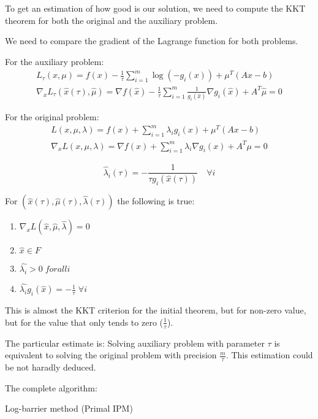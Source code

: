 To get an estimation of how good is our solution, we need to compute the KKT theorem for both the original and the auxiliary problem.

We need to compare the gradient of the Lagrange function for both problems.

For the auxiliary problem:
\begin{gather*}
    L_\tau (x, \mu) = f(x) - \frac{1}{\tau} \sum_{i=1}^m \log{(-g_i(x))} + \mu^T (A x - b) \\
    \nabla_x L_\tau (\hat{x}(\tau), \hat{\mu}) = \nabla f(\hat{x}) - \frac{1}{\tau} \sum_{i=1}^m \frac{1}{g_i(\hat{x})} \nabla g_i(\hat{x}) + A^T \hat{\mu} = 0
\end{gather*}

For the original problem:
\begin{gather*}
    L(x, \mu, \lambda) = f(x) + \sum_{i=1}^m \lambda_i g_i(x) + \mu^T (A x - b) \\
    \nabla_x L(x, \mu, \lambda) = \nabla f(x) + \sum_{i=1}^m \lambda_i \nabla g_i(x) + A^T \mu = 0
\end{gather*}

\[ 
    \hat{\lambda}_i(\tau) = - \frac{1}{\tau g_i (\hat{x}(\tau))} \quad \forall i
\] 

For $(\hat{x}(\tau), \hat{\mu}(\tau), \hat{\lambda}(\tau))$ the following is true: 
\begin{enumerate}
    \item $\nabla_x L(\hat{x}, \hat{\mu}, \hat{\lambda}) = 0$ 
    \item $\hat{x} \in F$ 
    \item $\hat{\lambda_i} > 0 \; forall i$ 
    \item $\hat{\lambda_i} g_i (\hat{x}) = - \frac{1}{\tau} \; \forall i$
\end{enumerate}

This is almost the KKT criterion for the initial theorem, but for non-zero value, but for the value that only tends to zero ($\frac{1}{\tau}$). 

The particular estimate is: Solving auxiliary problem with parameter $\tau$ is equivalent to solving the original problem with precision $\frac{m}{\tau}$. This estimation could be not haradly deduced. 

The complete algorithm: 

\begin{algorithm}
    \caption{Log-barrier method (Primal IPM)}
    \begin{algorithmic}[1]
    \State{$\varepsilon$}
    \EndWhile{}
    \end{algorithmic}
\end{algorithm}

